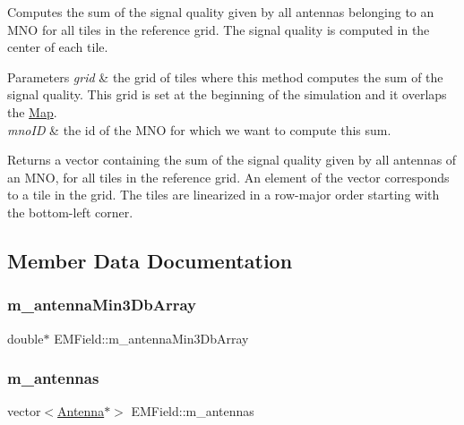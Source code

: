 Computes the sum of the signal quality given by all antennas belonging to an M\+NO for all tiles in the reference grid. The signal quality is computed in the center of each tile. 
\begin{DoxyParams}{Parameters}
{\em grid} & the grid of tiles where this method computes the sum of the signal quality. This grid is set at the beginning of the simulation and it overlaps the \hyperlink{class_map}{Map}. \\
\hline
{\em mno\+ID} & the id of the M\+NO for which we want to compute this sum. \\
\hline
\end{DoxyParams}
\begin{DoxyReturn}{Returns}
a vector containing the sum of the signal quality given by all antennas of an M\+NO, for all tiles in the reference grid. An element of the vector corresponds to a tile in the grid. The tiles are linearized in a row-\/major order starting with the bottom-\/left corner. 
\end{DoxyReturn}


\subsection{Member Data Documentation}
\mbox{\label{class_e_m_field_a96c4c7bc39c2f8afea0dca3280fe145c}} 
\subsubsection{\texorpdfstring{m\+\_\+antenna\+Min3\+Db\+Array}{m\_antennaMin3DbArray}}
{\footnotesize\ttfamily double$\ast$ E\+M\+Field\+::m\+\_\+antenna\+Min3\+Db\+Array\hspace{0.3cm}{\ttfamily [private]}}

\mbox{\label{class_e_m_field_ab74a3bde70b66fd033bde6c25345a755}} 
\subsubsection{\texorpdfstring{m\+\_\+antennas}{m\_antennas}}
{\footnotesize\ttfamily vector$<$\hyperlink{class_antenna}{Antenna}$\ast$$>$ E\+M\+Field\+::m\+\_\+antennas\hspace{0.3cm}{\ttfamily [private]}}

